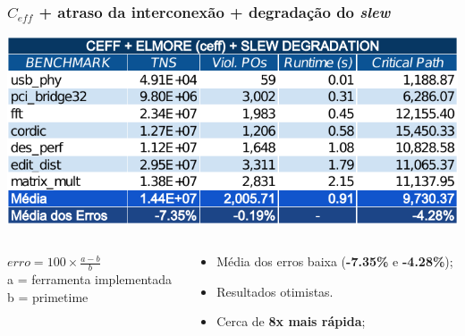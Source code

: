 \documentclass[10pt,a4paper]{beamer}
\begin{document}
		
		\begin{frame}[t]
			\frametitle{$C_{eff}$ + atraso da interconexão + degradação do \textit{slew}}
			\vspace{-.5cm}
			\begin{center}
				\includegraphics[width=0.9\linewidth]{img/ceff_elmore_slew.pdf}
			\end{center}
			\vspace{-.5cm}
			\begin{columns}
				\begin{column}{0.4\textwidth}
					\begin{shaded}
						$erro = 100 \times \frac{a - b}{ b } $ \\
						\small{a = ferramenta implementada} \\
						\small{b = primetime}
					\end{shaded}
				\end{column}
				\begin{column}{0.6\textwidth}
					\begin{itemize}
						\item Média dos erros baixa (\textbf{-7.35\%} e \textbf{-4.28\%});
						\item Resultados otimistas.
						\item Cerca de \textbf{8x mais rápida};
					\end{itemize}
				\end{column}
			\end{columns}			
			
		\end{frame}
		
\end{document}
